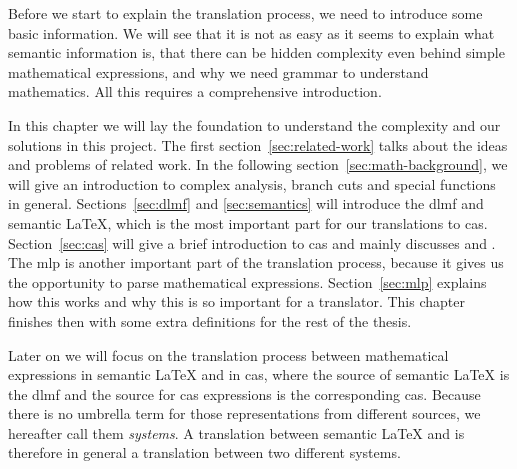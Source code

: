 Before we start to explain the translation process, we need to introduce some basic information. We will see that it is not as easy as it seems to explain what semantic information is, that there can be hidden complexity even behind simple mathematical expressions, and why we need grammar to understand mathematics. All this requires a comprehensive introduction.

In this chapter we will lay the foundation to understand the complexity and our solutions in this project. The first section~\ref{sec:related-work} talks about the ideas and problems of related work. In the following section~\ref{sec:math-background}, we will give an introduction to complex analysis, branch cuts and special functions in general. Sections~\ref{sec:dlmf} and \ref{sec:semantics} will introduce the \gls{dlmf} and semantic \LaTeX, which is the most important part for our translations to \gls{cas}. Section~\ref{sec:cas} will give a brief introduction to \gls{cas} and mainly discusses \Maple{} and \Mathematica. The \gls{mlp} is another important part of the translation process, because it gives us the opportunity to parse mathematical expressions. Section~\ref{sec:mlp} explains how this works and why this is so important for a translator. This chapter finishes then with some extra definitions for the rest of the thesis.

Later on we will focus on the translation process between mathematical expressions in semantic \LaTeX{} and in \gls{cas}, where the source of semantic \LaTeX{} is the \gls{dlmf} and the source for \gls{cas} expressions is the corresponding \gls{cas}. Because there is no umbrella term for those representations from different sources, we hereafter call them \textit{systems}. A translation between semantic \LaTeX{} and \Maple{} is therefore in general a translation between two different systems.